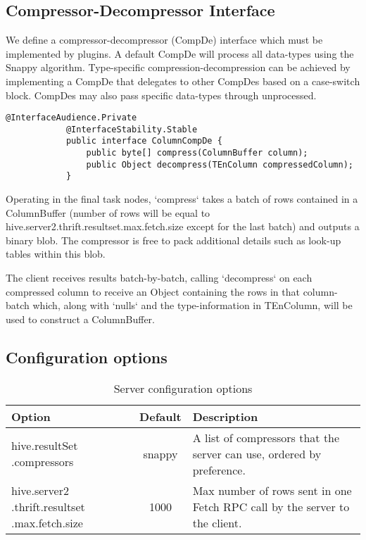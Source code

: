 \documentclass[11pt,a4paper]{article}
\begin{document}
	\subsection{Compressor-Decompressor Interface}
		We define a compressor-decompressor (CompDe) interface which must be implemented by plugins.
		A default CompDe will process all data-types using the Snappy algorithm.
		Type-specific compression-decompression can be achieved by implementing a CompDe that delegates to other CompDes based on a case-switch block.
		CompDes may also pass specific data-types through unprocessed.
		
		\begin{lstlisting}[title=org.apache.hive.service.cli.CompDe; CompDe.java,gobble=6,otherkeywords={ColumnBuffer,Object,TEnColumn}]
			@InterfaceAudience.Private
			@InterfaceStability.Stable
			public interface ColumnCompDe {
				public byte[] compress(ColumnBuffer column);
				public Object decompress(TEnColumn compressedColumn);
			}
		\end{lstlisting}
		
		Operating in the final task nodes, `compress` takes a batch of rows contained in a ColumnBuffer (number of rows will be equal to \linebreak hive.server2.thrift.resultset.max.fetch.size except for the last batch) and outputs a binary blob.
		The compressor is free to pack additional details such as look-up tables within this blob.
		
		The client receives results batch-by-batch, calling `decompress` on each compressed column to receive an Object containing the rows in that column-batch which, along with `nulls` and the type-information in TEnColumn, will be used to construct a ColumnBuffer.
		
	\subsection{Configuration options}
		\begin{table}[H]
			\begin{tabular}{| p{3cm} | c | p{6.5cm} |} \hline
				\textbf{Option} & \textbf{Default} & \textbf{Description} \\ \hline
				hive.resultSet\linebreak
				.compressors
				& snappy & A list of compressors that the server can use, ordered by preference.
				\\ \hline
				hive.server2\linebreak
				.thrift.resultset\linebreak
				.max.fetch.size
				& 1000 & Max number of rows sent in one Fetch RPC call by the server to the client.
				\\ \hline
			\end{tabular}
			\caption{Server configuration options}
		\end{table}
\end{document}
